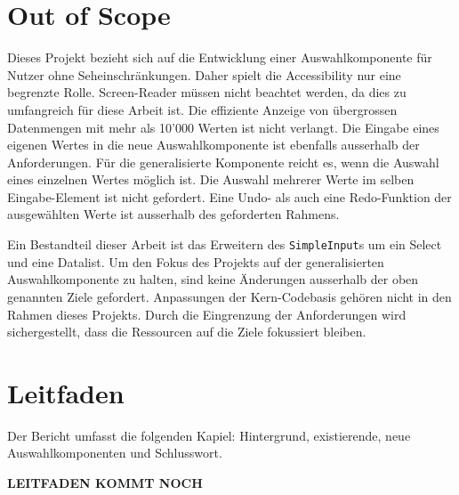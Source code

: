 \section{Out of Scope}

Dieses Projekt bezieht sich auf die Entwicklung einer Auswahlkomponente für Nutzer ohne Seheinschränkungen.
Daher spielt die Accessibility nur eine begrenzte Rolle.
Screen-Reader müssen nicht beachtet werden, da dies zu umfangreich für diese Arbeit ist.
Die effiziente Anzeige von übergrossen Datenmengen mit mehr als 10'000 Werten ist nicht verlangt.
Die Eingabe eines eigenen Wertes in die neue Auswahlkomponente ist ebenfalls ausserhalb der Anforderungen.
Für die generalisierte Komponente reicht es, wenn die Auswahl eines einzelnen Wertes möglich ist.
Die Auswahl mehrerer Werte im selben Eingabe-Element ist nicht gefordert.
Eine Undo- als auch eine Redo-Funktion der ausgewählten Werte ist ausserhalb des geforderten Rahmens. 

Ein Bestandteil dieser Arbeit ist das Erweitern des \texttt{SimpleInput}s um ein Select und eine Datalist.
Um den Fokus des Projekts auf der generalisierten Auswahlkomponente zu halten, sind keine Änderungen ausserhalb der oben genannten Ziele gefordert.
Anpassungen der Kern-Codebasis gehören nicht in den Rahmen dieses Projekts.
Durch die Eingrenzung der Anforderungen wird sichergestellt, dass die Ressourcen auf die Ziele fokussiert bleiben.


\section{Leitfaden}

Der Bericht umfasst die folgenden Kapiel: Hintergrund, existierende, neue Auswahlkomponenten und Schlusswort. 

{\color{red} \textbf{LEITFADEN KOMMT NOCH}}

